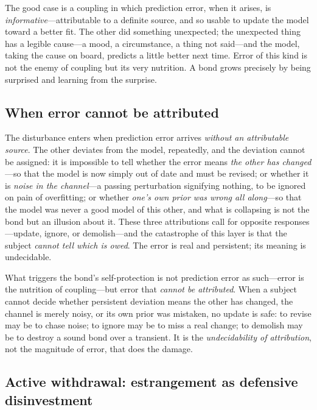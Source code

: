 The good case is a coupling in which prediction error, when it arises, is \emph{informative}---attributable to a definite source, and so usable to update the model toward a better fit. The other did something unexpected; the unexpected thing has a legible cause---a mood, a circumstance, a thing not said---and the model, taking the cause on board, predicts a little better next time. Error of this kind is not the enemy of coupling but its very nutrition. A bond grows precisely by being surprised and learning from the surprise.

\subsection{When error cannot be attributed}
\label{p17:sub:prediction-unattrib}

The disturbance enters when prediction error arrives \emph{without an attributable source}. The other deviates from the model, repeatedly, and the deviation cannot be assigned: it is impossible to tell whether the error means \emph{the other has changed}---so that the model is now simply out of date and must be revised; or whether it is \emph{noise in the channel}---a passing perturbation signifying nothing, to be ignored on pain of overfitting; or whether \emph{one's own prior was wrong all along}---so that the model was never a good model of this other, and what is collapsing is not the bond but an illusion about it. These three attributions call for opposite responses---update, ignore, or demolish---and the catastrophe of this layer is that the subject \emph{cannot tell which is owed}. The error is real and persistent; its meaning is undecidable.

\begin{claim}
What triggers the bond's self-protection is not prediction error as such---error is the nutrition of coupling---but error that \emph{cannot be attributed}. When a subject cannot decide whether persistent deviation means the other has changed, the channel is merely noisy, or its own prior was mistaken, no update is safe: to revise may be to chase noise; to ignore may be to miss a real change; to demolish may be to destroy a sound bond over a transient. It is the \emph{undecidability of attribution}, not the magnitude of error, that does the damage.
\end{claim}

\subsection{Active withdrawal: estrangement as defensive disinvestment}
\label{p17:sub:prediction-withdrawal}

